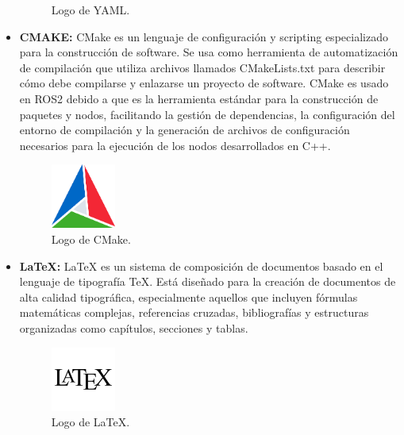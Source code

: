 \documentclass[12pt, a4paper, twoside]{article}
\begin{document}
\begin{itemize}
\begin{figure}[h]
    \caption{Logo de YAML.}
  \end{figure} 
  \item \textbf{CMAKE:\cite{cmake}} CMake es un lenguaje de configuración y scripting especializado para la construcción de software.
  Se usa como herramienta de automatización de compilación que utiliza archivos llamados CMakeLists.txt para describir 
  cómo debe compilarse y enlazarse un proyecto de software. CMake es usado en ROS2 debido a que es la herramienta 
  estándar para la construcción de paquetes y nodos, facilitando la gestión de dependencias, la configuración del entorno
  de compilación y la generación de archivos de configuración necesarios para la ejecución de los nodos desarrollados en C++.
  \begin{figure}[h]
    \centering
      \includegraphics[width=0.2\textwidth]{cmake_logo.png}
    \caption{Logo de CMake.}
  \end{figure} 
  \item \textbf{LaTeX:\cite{lamport1994latex}} LaTeX es un sistema de composición de documentos basado en el lenguaje de tipografía TeX. Está 
  diseñado para la creación de documentos de alta calidad tipográfica, especialmente aquellos que incluyen fórmulas matemáticas 
  complejas, referencias cruzadas, bibliografías y estructuras organizadas como capítulos, secciones y tablas.
  \begin{figure}[h]
    \centering
      \includegraphics[width=0.2\textwidth]{Latex_logo.png}
    \caption{Logo de LaTeX.}
  \end{figure} 
\end{itemize}
\end{document}
